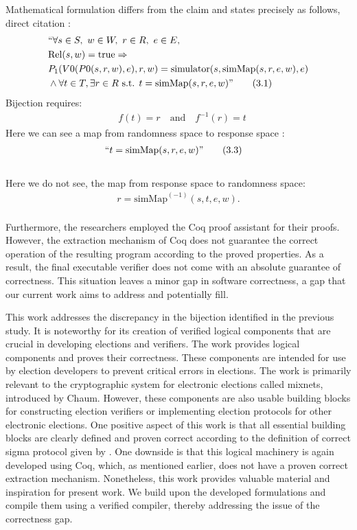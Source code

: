 Mathematical formulation differs from the claim and states precisely as follows, direct citation \cite{Haines2019VerifiedVF}:
\begin{align}
&`` \forall s \in S, \ w \in W,  \ r \in R,  \ e \in E, \nonumber \\
&\text{Rel}(s,w) = \text{true} \Rightarrow \label{eq:1} \nonumber \\
&P_1(V0(P0(s,r,w),e),r,w) = \text{simulator}(s,\text{simMap}(s,r,e,w),e)   \nonumber \\
&\land \forall t \in T, \exists r \in R \text{ s.t. } t = \text{simMap}(s,r,e,w)" \tag{3.1}
\end{align}
Bijection requires:\\
\begin{align}
&f(t) = r \quad \text{and} \quad f^{-1}(r) = t \tag{3.2} 
\end{align} 
Here we can see a map from randomness space to response space \cite{Haines2019VerifiedVF}:\\
\begin{align}
&``t = \text{simMap}(s,r,e,w)" \tag{3.3} 
\end{align}\nonumber \\
Here we do not see, the map from response space to randomness space:
\begin{align}
r = \text{simMap}^{(-1)}(s,t,e,w). \tag{3.4} 
\end{align}\nonumber \\
Furthermore, the researchers employed the Coq proof assistant for their proofs. However, the extraction mechanism of Coq does not guarantee the correct operation of the resulting program according to the proved properties. As a result, the final executable verifier does not come with an absolute guarantee of correctness. This situation leaves a minor gap in software correctness, a gap that our current work aims to address and potentially fill.

This work addresses the discrepancy in the bijection identified in the previous study\cite{Haines2019VerifiedVF}. It is noteworthy for its creation of verified logical components that are crucial in developing elections and verifiers\cite{Haines2021DidYM}. The work provides logical components and proves their correctness. These components are intended for use by election developers to prevent critical errors in elections. The work is primarily relevant to the cryptographic system for electronic elections called mixnets, introduced by Chaum\cite{Chaum1981UntraceableEM}. However, these components are also usable building blocks for constructing election verifiers or implementing election protocols for other electronic elections. One positive aspect of this work is that all essential building blocks are clearly defined and proven correct according to the definition of correct sigma protocol given by \cite{Cramer1997ModularDO}. One downside is that this logical machinery is again developed using Coq, which, as mentioned earlier, does not have a proven correct extraction mechanism. Nonetheless, this work provides valuable material and inspiration for present work. We build upon the developed formulations and compile them using a verified compiler, thereby addressing the issue of the correctness gap.


